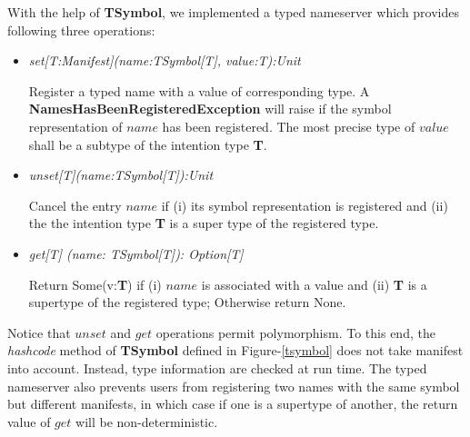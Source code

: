 With the help of {\bf TSymbol}, we implemented a typed nameserver which provides
following three operations:
\begin{itemize}
  \item {\it set[T:Manifest](name:TSymbol[T], value:T):Unit}

Register a typed name with a value of corresponding type.  A {\bf
NamesHasBeenRegisteredException} will raise if the symbol representation of
$name$ has been registered.  The most precise type of $value$ shall be a subtype
of the intention type {\bf T}.

  \item {\it unset[T](name:TSymbol[T]):Unit}

Cancel the entry $name$ if (i)  its symbol representation is registered and (ii)
the the intention type {\bf T} is a super type of the registered type.

  \item {\it get[T] (name: TSymbol[T]): Option[T]}

Return Some(v:{\bf T}) if (i) $name$ is associated with a value and (ii) {\bf T}
is a supertype of the registered type; Otherwise return None.
\end{itemize}

Notice that $unset$ and $get$ operations permit polymorphism.  To this end, the
{\it hashcode} method of {\bf TSymbol} defined in Figure-{\ref{tsymbol}} does
not take manifest into account.  Instead, type information are checked at run
time. The typed nameserver also prevents users from registering two names with
the same symbol but different manifests, in which case if one is a supertype of
another, the return value of $get$ will be non-deterministic.

